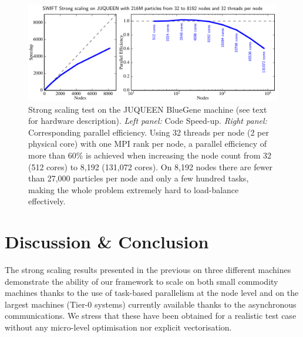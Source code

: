 \documentclass{sig-alternate-05-2015}
\begin{document}
\begin{figure}
\centering
\includegraphics[width=\textwidth]{Figures/scalingBlueGene}
\caption{Strong scaling test on the JUQUEEN BlueGene machine (see text
  for hardware description). \textit{Left panel:} Code
  Speed-up. \textit{Right panel:} Corresponding parallel efficiency.
  Using 32 threads per node (2 per physical core) with one MPI rank
  per node, a parallel efficiency of more than $60\%$ is achieved when
  increasing the node count from 32 (512 cores) to 8,192 (131,072
  cores). On 8,192 nodes there are fewer than 27,000 particles per
  node and only a few hundred tasks, making the whole problem
  extremely hard to load-balance effectively.
  \label{fig:JUQUEEN2}}
\end{figure}






\section{Discussion \& Conclusion}

The strong scaling results presented in the previous on three different machines
demonstrate the ability of our framework to scale on both small commodity
machines thanks to the use of task-based parallelism at the node level and on
the largest machines (Tier-0 systems) currently available thanks to the
asynchronous communications. We stress that these have been obtained for a
realistic test case without any micro-level optimisation nor explicit
vectorisation.
\end{document}

